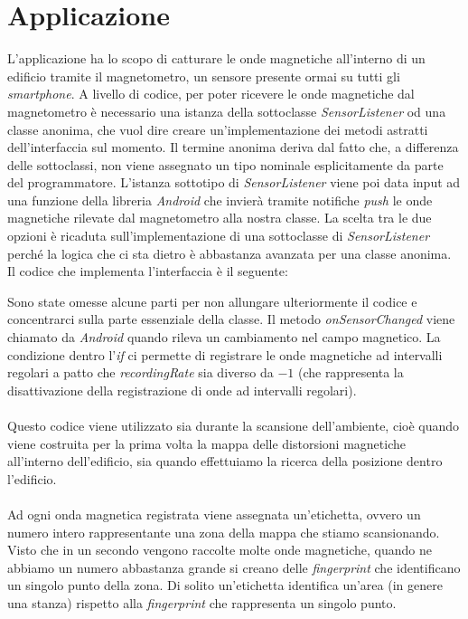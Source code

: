 \section{Applicazione}
L'applicazione ha lo scopo di catturare le onde magnetiche all'interno di un edificio tramite il magnetometro, un sensore presente ormai su tutti gli \textit{smartphone}. A livello di codice, per poter ricevere le onde magnetiche dal magnetometro \`e necessario una istanza della sottoclasse \textit{SensorListener} od una classe anonima, che vuol dire creare un'implementazione dei metodi astratti dell'interfaccia sul momento. Il termine anonima deriva dal fatto che, a differenza delle sottoclassi, non viene assegnato un tipo nominale esplicitamente da parte del programmatore. L'istanza sottotipo di \textit{SensorListener} viene poi data input ad una funzione della libreria \textit{Android} che invier\`a  tramite notifiche \textit{push} le onde magnetiche rilevate dal magnetometro alla nostra classe. La scelta tra le due opzioni \`e ricaduta sull'implementazione di una sottoclasse di \textit{SensorListener} perch\'e la logica che ci sta dietro \`e abbastanza avanzata per una classe anonima. Il codice che implementa l'interfaccia  \`e il seguente:

Sono state omesse alcune parti per non allungare ulteriormente il codice e concentrarci sulla parte essenziale della classe. Il metodo \textit{onSensorChanged} viene chiamato da \textit{Android} quando rileva un cambiamento nel campo magnetico. La condizione dentro l'\textit{if} ci permette di registrare le onde magnetiche ad intervalli regolari a patto che \textit{recordingRate} sia diverso da $-1$ (che rappresenta la  disattivazione della registrazione di onde ad intervalli regolari).
\\\\
Questo codice viene utilizzato sia durante la scansione dell'ambiente, cio\`e quando viene costruita per la prima volta la mappa delle distorsioni magnetiche all'interno dell'edificio, sia quando effettuiamo la ricerca della posizione dentro l'edificio.
\\\\
Ad ogni onda magnetica registrata viene assegnata un'etichetta, ovvero un numero intero rappresentante una zona della mappa che stiamo scansionando. Visto che in un secondo vengono raccolte molte onde magnetiche, quando ne abbiamo un numero abbastanza grande si creano delle \textit{fingerprint} che identificano un singolo punto della zona. Di solito un'etichetta identifica un'area (in genere una stanza) rispetto alla \textit{fingerprint} che rappresenta un singolo punto.
